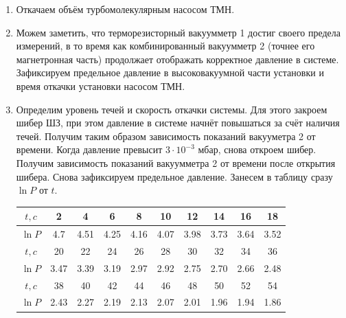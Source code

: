 \documentclass[12pt,a4paper]{article}
\begin{document}
\begin{enumerate}
\begin{enumerate}
			\item Откачаем объём турбомолекулярным насосом ТМН.
			
			\item Можем заметить, что терморезисторный вакуумметр 1 достиг своего предела измерений, в то время как комбинированный вакуумметр 2 (точнее его магнетронная часть) продолжает отображать корректное давление в системе. Зафиксируем предельное давление в высоковакуумной части установки и время откачки установки насосом ТМН.
			
			\item Определим уровень течей и скорость откачки системы. Для этого закроем шибер ШЗ, при этом давление в системе начнёт повышаться за счёт наличия течей. Получим таким образом зависимость показаний вакууметра 2 от времени. Когда давление превысит $3 \cdot 10^{-3}$ мбар, снова откроем шибер. Получим зависимость показаний вакуумметра 2 от времени после открытия шибера. Снова зафиксируем предельное давление. Занесем в таблицу сразу $\ln{P}$ от $t$.
			
		\begin{center}
			\begin{tabular}{|c|c|c|c|c|c|c|c|c|c|} \hline
				$t, c$ & 2 & 4 & 6 & 8 & 10 & 12 & 14 & 16 & 18 \\ \hline
				$\ln{P}$ & 4.7 & 4.51 & 4.25 & 4.16 & 4.07 & 3.98 & 3.73 & 3.64 & 3.52 \\ \hline
				$t, c$ & 20 & 22 & 24 & 26 & 28 & 30 & 32 & 34 & 36 \\ \hline
				$\ln{P}$ & 3.47 & 3.39 & 3.19 & 2.97 & 2.92 & 2.75 & 2.70 & 2.66 & 2.48 \\ \hline
				$t, c$ & 38 & 40 & 42 & 44 & 46 & 48 & 50 & 52 & 54 \\ \hline
				$\ln{P}$ & 2.43 & 2.27 & 2.19 & 2.13 & 2.07 & 2.01 & 1.96 & 1.94 & 1.86 \\ \hline
			\end{tabular}				
		\end{center}	
		

\end{enumerate}
\end{enumerate}
\end{document}
